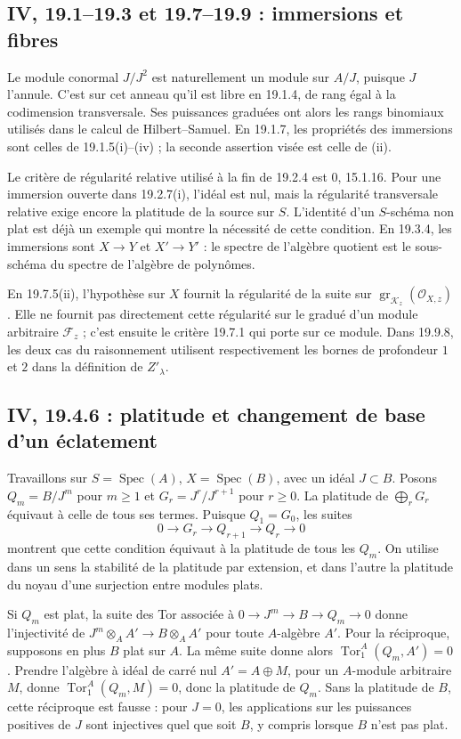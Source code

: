 \documentclass[11pt,a4paper]{article}
\begin{document}
\subsection{IV, 19.1--19.3 et 19.7--19.9 : immersions et fibres}
\label{note:iv4-immersions}
Le module conormal $J/J^2$ est naturellement un module sur $A/J$,
puisque $J$ l'annule. C'est sur cet anneau qu'il est libre en 19.1.4,
de rang égal à la codimension transversale. Ses puissances graduées
ont alors les rangs binomiaux utilisés dans le calcul de Hilbert--Samuel.
En 19.1.7, les propriétés des immersions sont celles de 19.1.5(i)--(iv) ;
la seconde assertion visée est celle de (ii).

Le critère de régularité relative utilisé à la fin de 19.2.4 est
0, 15.1.16. Pour une immersion ouverte dans 19.2.7(i), l'idéal est nul,
mais la régularité transversale relative exige encore la platitude
de la source sur $S$. L'identité d'un $S$-schéma non plat est déjà
un exemple qui montre la nécessité de cette condition.
En 19.3.4, les immersions sont $X\to Y$ et $X'\to Y'$ :
le spectre de l'algèbre quotient est le sous-schéma du spectre de
l'algèbre de polynômes.

En 19.7.5(ii), l'hypothèse sur $X$ fournit la régularité de la suite
sur $\operatorname{gr}_{\mathcal K_z}(\mathcal O_{X,z})$.
Elle ne fournit pas directement cette régularité sur le gradué
d'un module arbitraire $\mathcal F_z$ ; c'est ensuite le critère
19.7.1 qui porte sur ce module. Dans 19.9.8, les deux cas du
raisonnement utilisent respectivement les bornes de profondeur
$1$ et $2$ dans la définition de $Z'_\lambda$.

\subsection{IV, 19.4.6 : platitude et changement de base d’un éclatement}
\label{note:iv4-blowups}
Travaillons sur $S=\operatorname{Spec}(A)$, $X=\operatorname{Spec}(B)$,
avec un idéal $J\subset B$. Posons
$Q_m=B/J^m$ pour $m\geq1$ et $G_r=J^r/J^{r+1}$ pour $r\geq0$.
La platitude de $\bigoplus_rG_r$ équivaut à celle de tous ses termes.
Puisque $Q_1=G_0$, les suites
\[
 0\longrightarrow G_r\longrightarrow Q_{r+1}
   \longrightarrow Q_r\longrightarrow0
\]
montrent que cette condition équivaut à la platitude de tous les $Q_m$.
On utilise dans un sens la stabilité de la platitude par extension,
et dans l'autre la platitude du noyau d'une surjection entre modules plats.

Si $Q_m$ est plat, la suite des Tor associée à
$0\to J^m\to B\to Q_m\to0$ donne l'injectivité de
$J^m\otimes_A A'\to B\otimes_A A'$ pour toute $A$-algèbre $A'$.
Pour la réciproque, supposons en plus $B$ plat sur $A$.
La même suite donne alors $\operatorname{Tor}_1^A(Q_m,A')=0$.
Prendre l'algèbre à idéal de carré nul $A'=A\oplus M$, pour un
$A$-module arbitraire $M$, donne
$\operatorname{Tor}_1^A(Q_m,M)=0$, donc la platitude de $Q_m$.
Sans la platitude de $B$, cette réciproque est fausse : pour $J=0$,
les applications sur les puissances positives de $J$ sont injectives
quel que soit $B$, y compris lorsque $B$ n'est pas plat.
\end{document}
